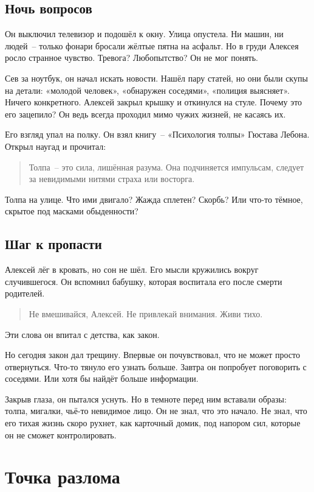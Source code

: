 \documentclass[12pt,a4paper]{book}
\begin{document}
\section{Ночь вопросов}

Он выключил телевизор и подошёл к окну. Улица опустела. Ни машин, ни людей~-- только фонари бросали жёлтые пятна на асфальт. Но в груди Алексея росло странное чувство. Тревога? Любопытство? Он не мог понять.

Сев за ноутбук, он начал искать новости. Нашёл пару статей, но они были скупы на детали: «молодой человек», «обнаружен соседями», «полиция выясняет». Ничего конкретного. Алексей закрыл крышку и откинулся на стуле. Почему это его зацепило? Он ведь всегда проходил мимо чужих жизней, не касаясь их.

Его взгляд упал на полку. Он взял книгу~-- «Психология толпы» Гюстава Лебона. Открыл наугад и прочитал:
\begin{quote}
Толпа~-- это сила, лишённая разума. Она подчиняется импульсам, следует за невидимыми нитями страха или восторга.
\end{quote}

Толпа на улице. Что ими двигало? Жажда сплетен? Скорбь? Или что-то тёмное, скрытое под масками обыденности?

\section{Шаг к пропасти}

Алексей лёг в кровать, но сон не шёл. Его мысли кружились вокруг случившегося. Он вспомнил бабушку, которая воспитала его после смерти родителей.
\begin{quote}
Не вмешивайся, Алексей. Не привлекай внимания. Живи тихо.
\end{quote}
Эти слова он впитал с детства, как закон.

Но сегодня закон дал трещину. Впервые он почувствовал, что не может просто отвернуться. Что-то тянуло его узнать больше. Завтра он попробует поговорить с соседями. Или хотя бы найдёт больше информации.

Закрыв глаза, он пытался уснуть. Но в темноте перед ним вставали образы: толпа, мигалки, чьё-то невидимое лицо. Он не знал, что это начало. Не знал, что его тихая жизнь скоро рухнет, как карточный домик, под напором сил, которые он не сможет контролировать.

\chapter{Точка разлома}
\end{document}

